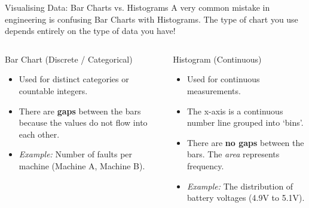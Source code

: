 \begin{frame}{Visualising Data: Bar Charts vs. Histograms}
    A very common mistake in engineering is confusing Bar Charts with Histograms. The type of chart you use depends entirely on the type of data you have!

    \begin{columns}[T]
        \begin{block}{Bar Chart (Discrete / Categorical)}
            \begin{itemize}
                \item Used for distinct categories or countable integers.
                \item There are \textbf{gaps} between the bars because the values do not flow into each other.
                \item \textit{Example:} Number of faults per machine (Machine A, Machine B).
            \end{itemize}
        \end{block}

        \begin{block}{Histogram (Continuous)}
            \begin{itemize}
                \item Used for continuous measurements.
                \item The x-axis is a continuous number line grouped into \lq bins\rq.
                \item There are \textbf{no gaps} between the bars. The \textit{area} represents frequency.
                \item \textit{Example:} The distribution of battery voltages (4.9V to 5.1V).
            \end{itemize}
        \end{block}
    \end{columns}
    
\end{frame}

